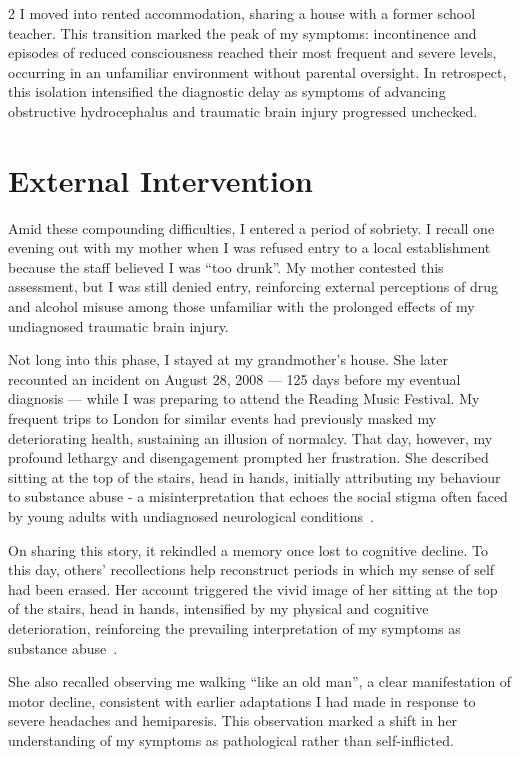 \documentclass{article}
\begin{document}
\begin{multicols}{2}
I moved into rented accommodation, sharing a house with a former school teacher. This transition marked the peak of my symptoms: incontinence and episodes of reduced consciousness reached their most frequent and severe levels, occurring in an unfamiliar environment without parental oversight. In retrospect, this isolation intensified the diagnostic delay as symptoms of advancing obstructive hydrocephalus and traumatic brain injury progressed unchecked.

\section*{External Intervention}
Amid these compounding difficulties, I entered a period of sobriety. I recall one evening out with my mother when I was refused entry to a local establishment because the staff believed I was “too drunk”. My mother contested this assessment, but I was still denied entry, reinforcing external perceptions of drug and alcohol misuse among those unfamiliar with the prolonged effects of my undiagnosed traumatic brain injury.

Not long into this phase, I stayed at my grandmother's house. She later recounted an incident on August 28, 2008 --- 125 days before my eventual diagnosis --- while I was preparing to attend the Reading Music Festival. My frequent trips to London for similar events had previously masked my deteriorating health, sustaining an illusion of normalcy. That day, however, my profound lethargy and disengagement prompted her frustration. She described sitting at the top of the stairs, head in hands, initially attributing my behaviour to substance abuse - a misinterpretation that echoes the social stigma often faced by young adults with undiagnosed neurological conditions~\cite{livingston2012,corrigan2017}.

On sharing this story, it rekindled a memory once lost to cognitive decline. To this day, others' recollections help reconstruct periods in which my sense of self had been erased. Her account triggered the vivid image of her sitting at the top of the stairs, head in hands, intensified by my physical and cognitive deterioration, reinforcing the prevailing interpretation of my symptoms as substance abuse~\cite{yang2017,hammarlund2018,zwick2020,mcginty2020,bielenberg2021,lankenau2012}.

She also recalled observing me walking “like an old man”, a clear manifestation of motor decline, consistent with earlier adaptations I had made in response to severe headaches and hemiparesis. This observation marked a shift in her understanding of my symptoms as pathological rather than self-inflicted.


\end{multicols}
\end{document}
